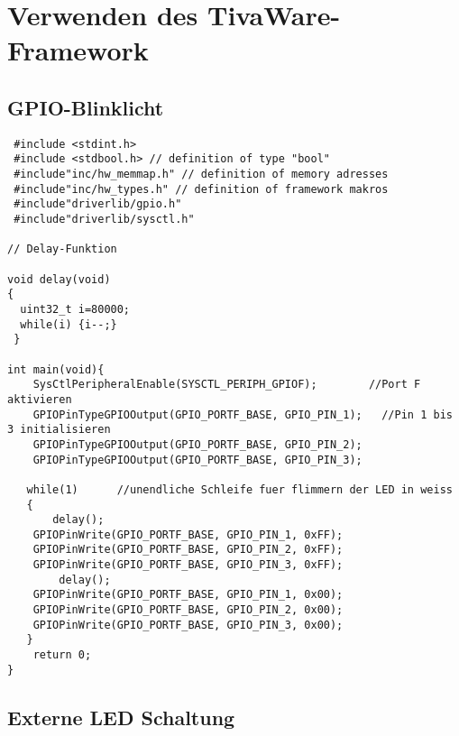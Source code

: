 \section{Verwenden des TivaWare-Framework}
\subsection{GPIO-Blinklicht}
\begin{lstlisting}
 #include <stdint.h>
 #include <stdbool.h> // definition of type "bool"
 #include"inc/hw_memmap.h" // definition of memory adresses
 #include"inc/hw_types.h" // definition of framework makros
 #include"driverlib/gpio.h"
 #include"driverlib/sysctl.h"
 
// Delay-Funktion

void delay(void)
{
  uint32_t i=80000;
  while(i) {i--;}
 }

int main(void){
    SysCtlPeripheralEnable(SYSCTL_PERIPH_GPIOF);        //Port F aktivieren
    GPIOPinTypeGPIOOutput(GPIO_PORTF_BASE, GPIO_PIN_1);   //Pin 1 bis 3 initialisieren
    GPIOPinTypeGPIOOutput(GPIO_PORTF_BASE, GPIO_PIN_2);
    GPIOPinTypeGPIOOutput(GPIO_PORTF_BASE, GPIO_PIN_3);

   while(1)      //unendliche Schleife fuer flimmern der LED in weiss
   {
       delay();
    GPIOPinWrite(GPIO_PORTF_BASE, GPIO_PIN_1, 0xFF);
    GPIOPinWrite(GPIO_PORTF_BASE, GPIO_PIN_2, 0xFF);
    GPIOPinWrite(GPIO_PORTF_BASE, GPIO_PIN_3, 0xFF);
        delay();
    GPIOPinWrite(GPIO_PORTF_BASE, GPIO_PIN_1, 0x00);
    GPIOPinWrite(GPIO_PORTF_BASE, GPIO_PIN_2, 0x00);
    GPIOPinWrite(GPIO_PORTF_BASE, GPIO_PIN_3, 0x00);
   }
    return 0;
}
\end{lstlisting}




\subsection{Externe LED Schaltung}
